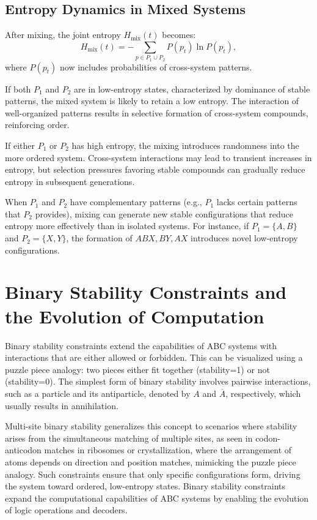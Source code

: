 \documentclass[entropy,article,submit,pdftex,moreauthors]{Definitions/mdpi}
\begin{document}
\subsection{Entropy Dynamics in Mixed Systems}

After mixing, the joint entropy \( H_{\text{mix}}(t) \) becomes:
\[
H_{\text{mix}}(t) = -\sum_{p \in P_1 \cup P_2} P(p_t) \ln P(p_t),
\]
where \( P(p_t) \) now includes probabilities of cross-system patterns.

If both \( P_1 \) and \( P_2 \) are in low-entropy states, characterized by dominance of stable patterns, the mixed system is likely to retain a low entropy. The interaction of well-organized patterns results in selective formation of cross-system compounds, reinforcing order.

If either \( P_1 \) or \( P_2 \) has high entropy, the mixing introduces randomness into the more ordered system. Cross-system interactions may lead to transient increases in entropy, but selection pressures favoring stable compounds can gradually reduce entropy in subsequent generations.

When \( P_1 \) and \( P_2 \) have complementary patterns (e.g., \( P_1 \) lacks certain patterns that \( P_2 \) provides), mixing can generate new stable configurations that reduce entropy more effectively than in isolated systems. For instance, if \( P_1 = \{A, B\} \) and \( P_2 = \{X, Y\} \), the formation of \( ABX, BY, AX \) introduces novel low-entropy configurations.

\section{Binary Stability Constraints and the Evolution of Computation}

Binary stability constraints extend the capabilities of ABC systems with interactions that are either allowed or forbidden. This can be visualized using a puzzle piece analogy: two pieces either fit together (stability=1) or not (stability=0). The simplest form of binary stability involves pairwise interactions, such as a particle and its antiparticle, denoted by \( A \) and \( \overline{A} \), respectively, which usually results in annihilation. 

Multi-site binary stability generalizes this concept to scenarios where stability arises from the simultaneous matching of multiple sites, as seen in codon-anticodon matches in ribosomes or crystallization, where the arrangement of atoms depends on direction and position matches, mimicking the puzzle piece analogy. Such constraints ensure that only specific configurations form, driving the system toward ordered, low-entropy states. Binary stability constraints expand the computational capabilities of ABC systems by enabling the evolution of logic operations and decoders. 
\end{document}
